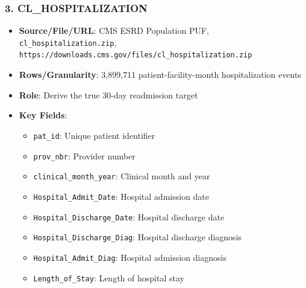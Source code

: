 \documentclass[conference]{IEEEtran}
\begin{document}
\subsubsection{3. CL_HOSPITALIZATION}
\begin{itemize}
    \item \textbf{Source/File/URL}: CMS ESRD Population PUF, \texttt{cl_hospitalization.zip}, \texttt{https://downloads.cms.gov/files/cl_hospitalization.zip}
    \item \textbf{Rows/Granularity}: 3,899,711 patient-facility-month hospitalization events
    \item \textbf{Role}: Derive the true 30-day readmission target
    \item \textbf{Key Fields}:
    \begin{itemize}
        \item \texttt{pat_id}: Unique patient identifier
        \item \texttt{prov_nbr}: Provider number
        \item \texttt{clinical_month_year}: Clinical month and year
        \item \texttt{Hospital_Admit_Date}: Hospital admission date
        \item \texttt{Hospital_Discharge_Date}: Hospital discharge date
        \item \texttt{Hospital_Discharge_Diag}: Hospital discharge diagnosis
        \item \texttt{Hospital_Admit_Diag}: Hospital admission diagnosis
        \item \texttt{Length_of_Stay}: Length of hospital stay
    \end{itemize}
\end{itemize}
\end{document}
